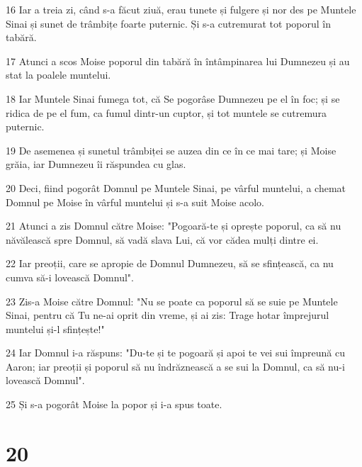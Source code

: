 \par 16 Iar a treia zi, când s-a făcut ziuă, erau tunete și fulgere și nor des pe Muntele Sinai și sunet de trâmbițe foarte puternic. Și s-a cutremurat tot poporul în tabără.
\par 17 Atunci a scos Moise poporul din tabără în întâmpinarea lui Dumnezeu și au stat la poalele muntelui.
\par 18 Iar Muntele Sinai fumega tot, că Se pogorâse Dumnezeu pe el în foc; și se ridica de pe el fum, ca fumul dintr-un cuptor, și tot muntele se cutremura puternic.
\par 19 De asemenea și sunetul trâmbiței se auzea din ce în ce mai tare; și Moise grăia, iar Dumnezeu îi răspundea cu glas.
\par 20 Deci, fiind pogorât Domnul pe Muntele Sinai, pe vârful muntelui, a chemat Domnul pe Moise în vârful muntelui și s-a suit Moise acolo.
\par 21 Atunci a zis Domnul către Moise: "Pogoară-te și oprește poporul, ca să nu năvălească spre Domnul, să vadă slava Lui, că vor cădea mulți dintre ei.
\par 22 Iar preoții, care se apropie de Domnul Dumnezeu, să se sfințească, ca nu cumva să-i lovească Domnul".
\par 23 Zis-a Moise către Domnul: "Nu se poate ca poporul să se suie pe Muntele Sinai, pentru că Tu ne-ai oprit din vreme, și ai zis: Trage hotar împrejurul muntelui și-l sfințește!"
\par 24 Iar Domnul i-a răspuns: "Du-te și te pogoară și apoi te vei sui împreună cu Aaron; iar preoții și poporul să nu îndrăznească a se sui la Domnul, ca să nu-i lovească Domnul".
\par 25 Și s-a pogorât Moise la popor și i-a spus toate.

\chapter{20}

